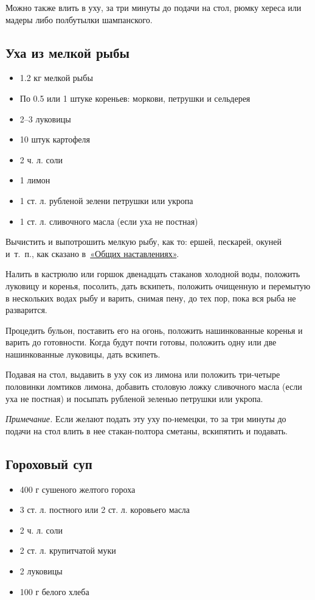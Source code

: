 Можно также влить в уху, за три минуты до подачи на стол, рюмку хереса или мадеры либо полбутылки шампанского.

\subsection{Уха из мелкой рыбы}\label{2uha-melk}

\begin{itemize}
	\item 1.2 кг мелкой рыбы 
    \item По 0.5 или 1 штуке кореньев: моркови, петрушки и сельдерея 
    \item 2–3 луковицы 
    \item 10 штук картофеля
    \item 2 ч. л. соли
    \item 1 лимон
    \item 1 ст. л. рубленой зелени петрушки или укропа 
    \item 1 ст. л. сливочного масла (если уха не постная)
\end{itemize}

Вычистить и выпотрошить мелкую рыбу, как то: ершей, пескарей, окуней и~т.~п., как сказано в~\hyperref[0sec:obsch-nast]{«Общих наставлениях»}. 

Налить в кастрюлю или горшок двенадцать стаканов холодной воды, положить луковицу и коренья, посолить, дать вскипеть, положить очищенную и перемытую в нескольких водах рыбу и варить, снимая пену, до тех пор, пока вся рыба не разварится.

Процедить бульон, поставить его на огонь, положить нашинкованные коренья и варить до готовности. Когда будут почти готовы, положить одну или две нашинкованные луковицы, дать вскипеть.

Подавая на стол, выдавить в уху сок из лимона или положить три-четыре половинки ломтиков лимона, добавить столовую ложку сливочного масла (если уха не постная) и посыпать рубленой зеленью петрушки или укропа.

\emph{Примечание.} Если желают подать эту уху по-немецки, то за три минуты до подачи на стол влить в нее стакан-полтора сметаны, вскипятить и подавать.

\subsection{Гороховый суп}\label{3goroh-sup}

\begin{itemize}
	\item 400 г сушеного желтого гороха
    \item 3 ст. л. постного или 2 ст. л. коровьего масла 
    \item 2 ч. л. соли
    \item 2 ст. л. крупитчатой муки
    \item 2 луковицы
    \item 100 г белого хлеба
\end{itemize}

